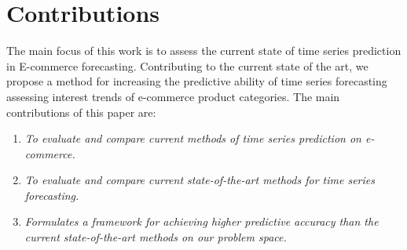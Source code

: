 \section{Contributions}
\label{sections:Introduction:Contributions}

The main focus of this work is to assess the current state of time series prediction in E-commerce forecasting.
Contributing to the current state of the art,
we propose a method for increasing the predictive ability of time series forecasting
assessing interest trends of e-commerce product categories.
The main contributions of this paper are:

\begin{enumerate}
    \item {\it To evaluate and compare current methods of time series prediction on e-commerce.}
    \item {\it To evaluate and compare current state-of-the-art methods for time series forecasting.}
    \item {\it Formulates a framework for achieving higher predictive accuracy than the current state-of-the-art methods on our problem space.}
\end{enumerate}


\iffalse
The main description of the contributions will come in chapter~\ref{cont} after the results are presented. This section just provides a brief summary of the main contributions of the work. This section can also be left out, leaving all discussions in chapter~\ref{cont}.

The format of this section will generally follow the following format:
{\it
Donec non turpis nec neque egestas faucibus nec id neque. Etiam consectetur, odio vitae gravida tempus, diam velit sagittis turpis, a molestie ligula tellus at nunc. Nam convallis consequat vestibulum. Proin dolor neque, dapibus a pellentesque a, commodo a nibh.}

\begin{enumerate}
\item {\it Lorem ipsum dolor sit amet, consectetur adipiscing elit.}
\item {\it Lorem ipsum dolor sit amet, consectetur adipiscing elit.}
\item {\it Lorem ipsum dolor sit amet, consectetur adipiscing elit.}
\end{enumerate}
\fi
